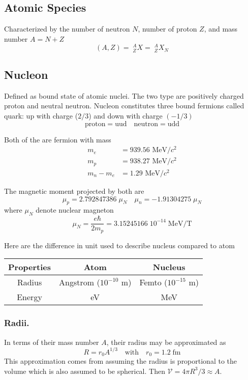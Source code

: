\documentclass[../../../main.tex]{subfiles}
\begin{document}
\subsection*{Atomic Species}
Characterized by the number of neutron $N$, number of proton $Z$, and mass number $A=N+Z$
\begin{equation*}
    (A,Z)= \;^A_ZX= \;^A_ZX_N
\end{equation*}

\subsection*{Nucleon}
Defined as bound state of atomic nuclei. The two type are positively charged proton and neutral neutron. Nucleon constitutes three bound fermions called quark: up with charge ($2/3$) and down with charge $(-1/3)$
\begin{equation*}
    \text{proton}=\text{uud}\quad\text{neutron}=\text{udd}
\end{equation*}

Both of the are fermion with mass 
\begin{align*}
    m_e&=939.56 \text{ MeV}/c^2\\ 
    m_p &= 938.27 \text{ MeV}/c^2\\
     m_n-m_e&=1.29 \text{ MeV}/c^2
\end{align*}

The magnetic moment projected by both are 
\begin{equation*}
    \mu_p=2.792 847 386  \;\mu_N\quad \mu_n=-1.913 042 75\;\mu_N
\end{equation*}
where $\mu_N$ denote nuclear magneton
\begin{equation*}
    \mu_N=\frac{e\hbar}{2m_p}=3.152 451 66\; 10^{-14}\;\text{MeV/T}
\end{equation*}

Here are the difference in unit used to describe nucleus compared to atom 
\begin{center}
    \begin{tabular}{c |c| c}
        Properties&Atom&Nucleus\\
        \hline\hline
        Radius&Angstrom ($10^{-10}$ m)&Femto ($10^{-15}$ m)\\
        Energy&eV&MeV
    \end{tabular}
\end{center}

\subsubsection*{Radii.} In terms of their mass number $A$, their radius may be approximated as 
\begin{equation*}
    R=r_0A^{1/3}\quad\text{with}\quad r_0=1.2\;\text{fm}
\end{equation*}
This approximation comes from assuming the radius is proportional to the volume which is also assumed to be spherical. Then $\mathcal{V}=4\pi R^3/3\approx A$. 
\end{document}
